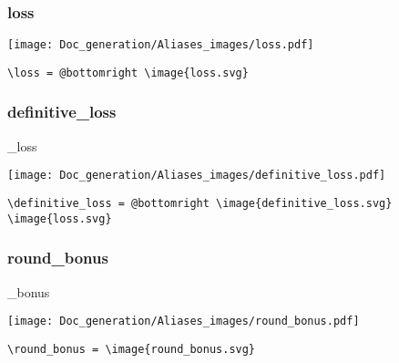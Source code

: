 \documentclass{article}
\begin{document}
\subsubsection{loss}
\begin{minipage}{0.45\linewidth}
\raggedright
\begin{spverbatim}
\loss
\end{spverbatim}
\end{minipage}
\begin{minipage}{0.45\linewidth}
\raggedleft
\texttt{[image: Doc\_generation/Aliases\_images/loss.pdf]}
\end{minipage}
\begin{center}
\begin{BVerbatim}
\loss = @bottomright \image{loss.svg}
\end{BVerbatim}
\end{center}

\subsubsection{definitive\_loss}
\begin{minipage}{0.45\linewidth}
\raggedright
\begin{spverbatim}
_loss
\end{spverbatim}
\end{minipage}
\begin{minipage}{0.45\linewidth}
\raggedleft
\texttt{[image: Doc\_generation/Aliases\_images/definitive\_loss.pdf]}
\end{minipage}
\begin{center}
\begin{BVerbatim}
\definitive_loss = @bottomright \image{definitive_loss.svg} \image{loss.svg}
\end{BVerbatim}
\end{center}

\subsubsection{round\_bonus}
\begin{minipage}{0.45\linewidth}
\raggedright
\begin{spverbatim}
\round_bonus
\end{spverbatim}
\end{minipage}
\begin{minipage}{0.45\linewidth}
\raggedleft
\texttt{[image: Doc\_generation/Aliases\_images/round\_bonus.pdf]}
\end{minipage}
\begin{center}
\begin{BVerbatim}
\round_bonus = \image{round_bonus.svg}
\end{BVerbatim}
\end{center}
\end{document}
